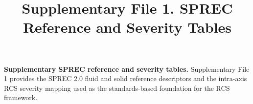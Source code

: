\documentclass[preprint,12pt]{elsarticle}
\renewcommand{\thetable}{S\arabic{table}}
\begin{document}
\begin{frontmatter}

\title{Supplementary File 1. SPREC Reference and Severity Tables}

\end{frontmatter}

\noindent\textbf{Supplementary SPREC reference and severity tables.}
Supplementary File 1 provides the SPREC 2.0 fluid and solid reference descriptors and the intra-axis RCS severity mapping used as the standards-based foundation for the RCS framework.

\setcounter{table}{0}
\renewcommand{\thetable}{S\arabic{table}}
\renewcommand{\arraystretch}{1.12}

\end{document}
